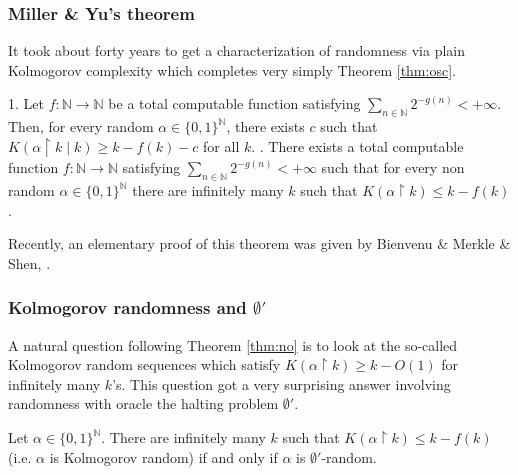 \subsubsection{Miller \& Yu's theorem}
It took about forty years to get a characterization of randomness
via plain Kolmogorov complexity which completes very simply
Theorem \ref{thm:osc}.
\begin{theorem}
\label{thm:milleryu}
1. Let $f:{\mathbb N}\to{\mathbb N}$ be a total computable function satisfying
$\sum_{n\in{\mathbb N}}2^{-g(n)}<+\infty$.
Then, for every random $\alpha\in{\{0,1\}^{\mathbb N}}$,
there exists $c$ such that
$K(\alpha{\!\upharpoonright \!} k \mid k) \geq k-f(k)-c$ for all $k$.
. There exists a total computable function $f:{\mathbb N}\to{\mathbb N}$ satisfying
$\sum_{n\in{\mathbb N}}2^{-g(n)}<+\infty$ such that
for every non random $\alpha\in{\{0,1\}^{\mathbb N}}$
there are infinitely many $k$ such that
$K(\alpha{\!\upharpoonright \!} k) \leq k-f(k)$.
\end{theorem}
Recently, an elementary proof of this theorem
was given by Bienvenu \& Merkle \& Shen, \cite{bms07}.
\subsubsection{Kolmogorov randomness and $\emptyset'$}
\label{sss:nies}
A natural question following Theorem \ref{thm:no} is to look at
the so-called Kolmogorov random sequences which satisfy
$K(\alpha{\!\upharpoonright \!} k)\geq k-O(1)$
for infinitely many $k$'s.
This question got a very surprising answer involving randomness
with oracle the halting problem $\emptyset'$.
\begin{theorem}
\label{thm:nies}
Let $\alpha\in{\{0,1\}^{\mathbb N}}$.
There are infinitely many $k$
such that $K(\alpha{\!\upharpoonright \!} k) \leq k-f(k)$
(i.e. $\alpha$ is Kolmogorov random)
if and only if $\alpha$ is $\emptyset'$-random.
\end{theorem}
